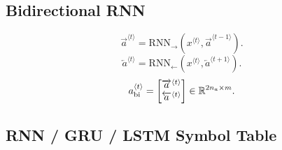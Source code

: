 \subsection{Bidirectional RNN}

\[
\overrightarrow{a}^{\langle t\rangle}
=
\mathrm{RNN}_{\rightarrow}
\left(
x^{\langle t\rangle},
\overrightarrow{a}^{\langle t-1\rangle}
\right).
\]
\[
\overleftarrow{a}^{\langle t\rangle}
=
\mathrm{RNN}_{\leftarrow}
\left(
x^{\langle t\rangle},
\overleftarrow{a}^{\langle t+1\rangle}
\right).
\]
\[
a_{\mathrm{bi}}^{\langle t\rangle}
=
\begin{bmatrix}
\overrightarrow{a}^{\langle t\rangle}\\
\overleftarrow{a}^{\langle t\rangle}
\end{bmatrix}
\in
\mathbb{R}^{2n_a \times m}.
\]

\subsection{RNN / GRU / LSTM Symbol Table}

